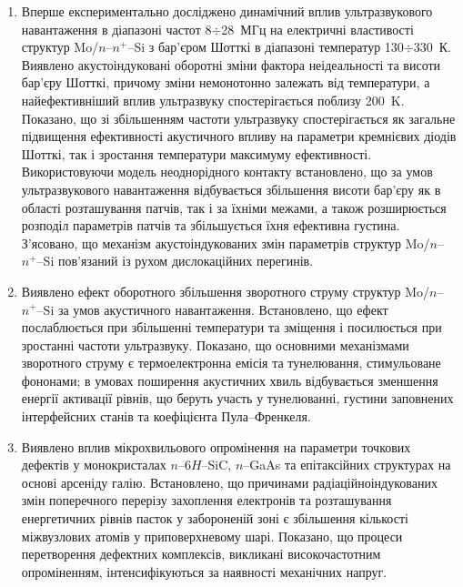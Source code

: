 \begin{enumerate}[leftmargin=0cm,itemindent=3em]
\item
Вперше експериментально досліджено динамічний вплив ультразвукового навантаження в діапазоні частот 8$\div$28~МГц на електричні властивості структур Mo/$n$--$n^{+}$--Si з бар'єром Шотткі в діапазоні температур 130$\div$330~К.
 Виявлено акустоіндуковані оборотні зміни фактора неідеальності та висоти бар'єру Шотткі, причому зміни немонотонно залежать від температури, а найефективніший вплив ультразвуку спостерігається поблизу 200~K.
  Показано, що зі збільшенням частоти ультразвуку  спостерігається як загальне підвищення ефективності акустичного впливу на параметри кремнієвих діодів Шотткі,
так і зростання температури максимуму ефективності.
 Використовуючи модель неоднорідного контакту встановлено, що за умов ультразвукового навантаження відбувається збільшення висоти бар'єру як в області розташування патчів, так і за їхніми межами, а також розширюється розподіл параметрів патчів та збільшується їхня ефективна густина.
З'ясовано, що механізм акустоіндукованих змін параметрів структур Mo/$n$--$n^{+}$--Si пов'язаний із рухом дислокаційних перегинів.

\item Виявлено ефект оборотного збільшення зворотного струму структур Mo/$n$--$n^{+}$--Si за умов акустичного навантаження.
Встановлено, що ефект послаблюється при збільшенні температури та зміщення і посилюється при зростанні частоти ультразвуку.
Показано, що основними механізмами зворотного струму є термоелектронна емісія та тунелювання, стимульоване фононами;
в умовах поширення акустичних хвиль відбувається зменшення енергії активації рівнів, що беруть участь у тунелюванні,
густини заповнених інтерфейсних станів та коефіцієнта Пула--Френкеля.

\item Виявлено вплив мікрохвильового опромінення на параметри точкових дефектів у монокристалах $n$--6$H$--SiC, $n$--GaAs та епітаксійних структурах на основі арсеніду галію.
Встановлено, що причинами радіаційноіндукованих змін поперечного перерізу захоплення електронів та розташування енергетичних рівнів пасток у забороненій зоні є
збільшення кількості міжвузлових атомів у приповерхневому шарі.
Показано, що процеси перетворення дефектних комплексів, викликані високочастотним опроміненням, інтенсифікуються за наявності механічних напруг.


\end{enumerate}
